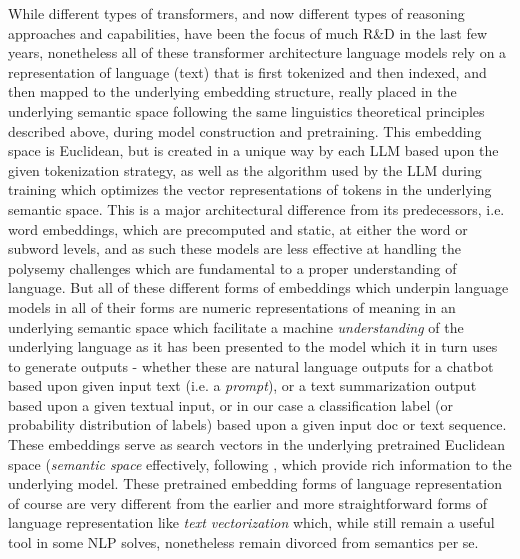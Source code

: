 \documentclass[final]{clv2025}
\begin{document}
While different types of transformers, and now different types of reasoning approaches and capabilities, have been the focus of much R\&D in the last few years, nonetheless all of these transformer architecture language models rely on a representation of language (text) that is first tokenized and then indexed, and then mapped to the underlying embedding structure, really placed in the underlying semantic space following the same linguistics theoretical principles described above, during model construction and pretraining. This embedding space is Euclidean, but is created in a unique way by each LLM based upon the given tokenization strategy, as well as the algorithm used by the LLM during training which optimizes the vector representations of tokens in the underlying semantic space. This is a major architectural difference from its predecessors, i.e. word embeddings, which are precomputed and static, at either the word or subword levels, and as such these models are less effective at handling the polysemy challenges which are fundamental to a proper understanding of language. But all of these different forms of embeddings which underpin language models in all of their forms are numeric representations of meaning in an underlying semantic space which facilitate a machine \textit{understanding} of the underlying language as it has been presented to the model which it in turn uses to generate outputs - whether these are natural language outputs for a chatbot based upon given input text (i.e. a \textit{prompt}), or a text summarization output based upon a given textual input, or in our case a classification label (or probability distribution of labels) based upon a given input doc or text sequence. These embeddings serve as search vectors in the underlying pretrained Euclidean space (\textit{semantic space} effectively, following \cite{worth}, which provide rich information to the underlying model. These pretrained embedding forms of language representation of course are very different from the earlier and more straightforward forms of language representation like \textit{text vectorization} which, while still remain a useful tool in some NLP solves, nonetheless remain divorced from semantics per se. 
\end{document}
